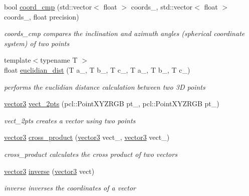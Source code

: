 \begin{DoxyCompactItemize}
bool \hyperlink{namespacecloud__object__segmentation_1_1aux_ae9f3fcf2ebe5ed733eceb4dc5845d418}{coord\+\_\+cmp} (std\+::vector$<$ float $>$ coords\+\_, std\+::vector$<$ float $>$ coords\+\_, float precision)
\begin{DoxyCompactList}\small\item\em coords\+\_\+cmp compares the inclination and azimuth angles (spherical coordinate system) of two points \end{DoxyCompactList}\item 
{\footnotesize template$<$typename T $>$ }\\float \hyperlink{namespacecloud__object__segmentation_1_1aux_aa39c38ffc1379874ede49b1079c21a34}{euclidian\+\_\+dist} (T a\+\_, T b\+\_, T c\+\_, T a\+\_, T b\+\_, T c\+\_)
\begin{DoxyCompactList}\small\item\em performs the euclidian distance calculation between two 3D points \end{DoxyCompactList}\item 
\hyperlink{classcloud__object__segmentation_1_1aux_1_1vector3}{vector3} \hyperlink{namespacecloud__object__segmentation_1_1aux_a0a4c9ef4676b55cbb72ef7212d112d00}{vect\+\_\+2pts} (pcl\+::\+Point\+X\+Y\+Z\+R\+GB pt\+\_, pcl\+::\+Point\+X\+Y\+Z\+R\+GB pt\+\_)
\begin{DoxyCompactList}\small\item\em vect\+\_\+2pts creates a vector using two points \end{DoxyCompactList}\item 
\hyperlink{classcloud__object__segmentation_1_1aux_1_1vector3}{vector3} \hyperlink{namespacecloud__object__segmentation_1_1aux_a6039339e8cdf62a949421f73033d2de9}{cross\+\_\+product} (\hyperlink{classcloud__object__segmentation_1_1aux_1_1vector3}{vector3} vect\+\_, \hyperlink{classcloud__object__segmentation_1_1aux_1_1vector3}{vector3} vect\+\_)
\begin{DoxyCompactList}\small\item\em cross\+\_\+product calculates the cross product of two vectors \end{DoxyCompactList}\item 
\hyperlink{classcloud__object__segmentation_1_1aux_1_1vector3}{vector3} \hyperlink{namespacecloud__object__segmentation_1_1aux_adc7f08f362cb4005bfd39fb9e61b17e6}{inverse} (\hyperlink{classcloud__object__segmentation_1_1aux_1_1vector3}{vector3} vect)
\begin{DoxyCompactList}\small\item\em inverse inverses the coordinates of a vector \end{DoxyCompactList}\item 

\end{DoxyCompactItemize}
